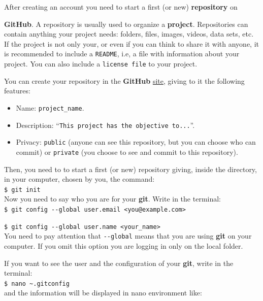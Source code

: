 \documentclass[12pt,a4paper,titlepage,brazil]{article}
\begin{document}
After creating an account you need to start a first (or new) {\bf repository} on {{\bf GitHub}. A repository is usually used to organize a {\bf project}. Repositories can contain anything your project needs: folders, files, images, videos, data sets, etc. If the project is not only your, or even if you can think to share it with anyone, it is recommended to include a \texttt{README}, i.e, a file with information about your project. You can also include a \texttt{license file} to your project.

You can create your repository in the {\bf GitHub} \href{https://github.com}{site}, giving to it the following features:
\begin{itemize}
 \item Name: \texttt{project\_name}.
 \item Description: ``\texttt{This project has the objective to...}''.
 \item Privacy: \texttt{public} (anyone can see this repository, but you can choose who can commit) or \texttt{private} (you choose to see and commit to this repository).
\end{itemize}
 
Then, you need to to start a first (or new) repository giving, inside the directory, in your computer, chosen by you, the command:\\

\texttt{\$ git init}\\

Now you need to say who you are for your {\bf git}. Write in the terminal:\\

\texttt{\$ git config -\hspace{0.01cm}-global user.email <you@example.com>}

\texttt{\$ git config -\hspace{0.01cm}-global user.name <your\_name>}\\

You need to pay attention that \texttt{-\hspace{0.01cm}-global} means that you are using {\bf git} on your computer. If you omit this option you are logging in only on the local folder.

If you want to see the user and the configuration of your {\bf git}, write in the terminal:\\

\texttt{\$ nano \~\/.gitconfig}\\

and the information will be displayed in nano environment like:\\

}
\end{document}

